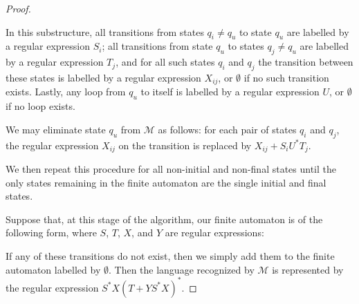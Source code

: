 \begin{theorem}
\begin{proof}
\begin{center}
\end{center}
In this substructure, all transitions from states $q_{i} \neq q_{u}$ to state $q_{u}$ are labelled by a regular expression $S_{i}$; all transitions from state $q_{u}$ to states $q_{j} \neq q_{u}$ are labelled by a regular expression $T_{j}$, and for all such states $q_{i}$ and $q_{j}$ the transition between these states is labelled by a regular expression $X_{ij}$, or $\emptyset$ if no such transition exists. Lastly, any loop from $q_{u}$ to itself is labelled by a regular expression $U$, or $\emptyset$ if no loop exists.

We may eliminate state $q_{u}$ from $\mathcal{M}$ as follows: for each pair of states $q_{i}$ and $q_{j}$, the regular expression $X_{ij}$ on the transition is replaced by $X_{ij} + S_{i}U^{*}T_{j}$.
\begin{center}
\end{center}
We then repeat this procedure for all non-initial and non-final states until the only states remaining in the finite automaton are the single initial and final states.

Suppose that, at this stage of the algorithm, our finite automaton is of the following form, where $S$, $T$, $X$, and $Y$ are regular expressions:
\begin{center}
\end{center}
If any of these transitions do not exist, then we simply add them to the finite automaton labelled by $\emptyset$. Then the language recognized by $\mathcal{M}$ is represented by the regular expression $S^{*}X(T + YS^{*}X)^{*}$.


\end{proof}
\end{theorem}
